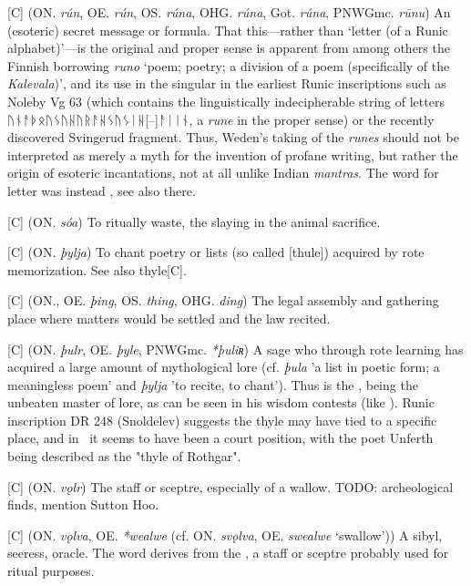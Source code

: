 \begin{itemize}
[C] (ON. \emph{rún}, OE. \emph{rún}, OS. \emph{rúna}, OHG. \emph{rúna}, Got. \emph{rúna}, PNWGmc. \emph{rūnu})
  An (esoteric) secret message or formula. That this—rather than ‘letter (of a Runic alphabet)’—is the original and proper sense is apparent from among others the Finnish borrowing \emph{runo} ‘poem; poetry; a division of a poem (specifically of the \emph{Kalevala})’, and its use in the singular in the earliest Runic inscriptions such as Noleby Vg 63 (which contains the linguistically indecipherable string of letters {ᚢᚾᚨᚦᛟᚢᛊᚢᚺᚢᚱᚨᚺᛊᚢᛊᛁᚺ[--]ᚨᛁᛁᚾ}, a \emph{rune} in the proper sense) or the recently discovered Svingerud fragment. Thus, Weden’s taking of the \emph{runes} should not be interpreted as merely a myth for the invention of profane writing, but rather the origin of esoteric incantations, not at all unlike Indian \emph{mantras}.
  The word for letter was instead , see also there.

[C] (ON. \emph{sóa})
  To ritually waste, the slaying in the animal sacrifice.

[C] (ON. \emph{þylja})
  To chant poetry or lists (so called [thule]) acquired by rote memorization. See also {thyle}[C].

[C] (ON., OE. \emph{þing}, OS. \emph{thing}, OHG. \emph{ding})
  The legal assembly and gathering place where matters would be settled and the law recited.

[C] (ON. \emph{þulr}, OE. \emph{þyle}, PNWGmc. \emph{*þuliʀ})
  A sage who through rote learning has acquired a large amount of mythological lore (cf. \emph{þula} 'a list in poetic form; a meaningless poem' and \emph{þylja} 'to recite, to chant'). Thus  is the , being the unbeaten master of lore, as can be seen in his wisdom contests (like \Vafthrudnismal). Runic inscription DR 248 (Snoldelev) suggests the thyle may have tied to a specific place, and in \Beowulf\ it seems to have been a court position, with the poet Unferth being described as the "thyle of Rothgar".

[C] (ON. \emph{vǫlr})
  The staff or sceptre, especially of a wallow. TODO: archeological finds, mention Sutton Hoo.

[C] (ON. \emph{vǫlva}, OE. \emph{*wealwe} (cf. ON. \emph{svǫlva}, OE. \emph{swealwe} ‘swallow’))
  A sibyl, seeress, oracle. The word derives from the , a staff or sceptre probably used for ritual purposes.


\end{itemize}
